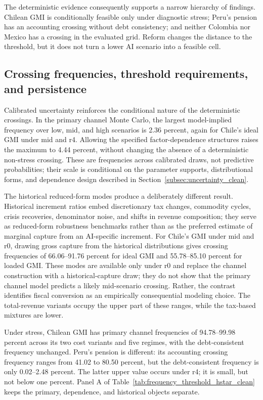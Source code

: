 

The deterministic evidence consequently supports a narrow hierarchy of findings. Chilean GMI is conditionally feasible only under diagnostic stress; Peru's pension has an accounting crossing without debt consistency; and neither Colombia nor Mexico has a crossing in the evaluated grid. Reform changes the distance to the threshold, but it does not turn a lower AI scenario into a feasible cell.

\subsection{Crossing frequencies, threshold requirements, and persistence}\label{subsec:results_mc_hstar}

Calibrated uncertainty reinforces the conditional nature of the deterministic crossings. In the primary channel Monte Carlo, the largest model-implied frequency over low, mid, and high scenarios is 2.36 percent, again for Chile's ideal GMI under mid and r4. Allowing the specified factor-dependence structures raises the maximum to 4.44 percent, without changing the absence of a deterministic non-stress crossing. These are frequencies across calibrated draws, not predictive probabilities; their scale is conditional on the parameter supports, distributional forms, and dependence design described in Section~\ref{subsec:uncertainty_clean}.

The historical reduced-form modes produce a deliberately different result. Historical increment ratios embed discretionary tax changes, commodity cycles, crisis recoveries, denominator noise, and shifts in revenue composition; they serve as reduced-form robustness benchmarks rather than as the preferred estimate of marginal capture from an AI-specific increment. For Chile's GMI under mid and r0, drawing gross capture from the historical distributions gives crossing frequencies of 66.06--91.76 percent for ideal GMI and 55.78--85.10 percent for loaded GMI. These modes are available only under r0 and replace the channel construction with a historical-capture draw; they do not show that the primary channel model predicts a likely mid-scenario crossing. Rather, the contrast identifies fiscal conversion as an empirically consequential modeling choice. The total-revenue variants occupy the upper part of these ranges, while the tax-based mixtures are lower.

Under stress, Chilean GMI has primary channel frequencies of 94.78--99.98 percent across its two cost variants and five regimes, with the debt-consistent frequency unchanged. Peru's pension is different: its accounting crossing frequency ranges from 41.02 to 80.50 percent, but the debt-consistent frequency is only 0.02--2.48 percent. The latter upper value occurs under r4; it is small, but not below one percent. Panel A of Table~\ref{tab:frequency_threshold_hstar_clean} keeps the primary, dependence, and historical objects separate.

